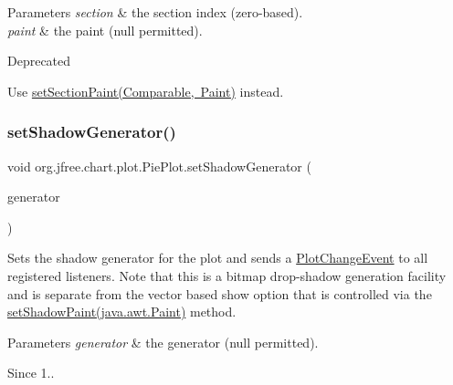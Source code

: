 \begin{DoxyParams}{Parameters}
{\em section} & the section index (zero-\/based). \\
\hline
{\em paint} & the paint ({\ttfamily null} permitted).\\
\hline
\end{DoxyParams}
\begin{DoxyRefDesc}{Deprecated}
\item[\mbox{\hyperlink{deprecated__deprecated000069}{Deprecated}}]Use \mbox{\hyperlink{classorg_1_1jfree_1_1chart_1_1plot_1_1_pie_plot_adee3362fbb406b556846f698e0ce628f}{set\+Section\+Paint(\+Comparable, Paint)}} instead. \end{DoxyRefDesc}
\mbox{\label{classorg_1_1jfree_1_1chart_1_1plot_1_1_pie_plot_a6b869408d47c89e6d9115101faecd8f4}} 
\subsubsection{\texorpdfstring{set\+Shadow\+Generator()}{setShadowGenerator()}}
{\footnotesize\ttfamily void org.\+jfree.\+chart.\+plot.\+Pie\+Plot.\+set\+Shadow\+Generator (\begin{DoxyParamCaption}\item[{\mbox{\hyperlink{interfaceorg_1_1jfree_1_1chart_1_1util_1_1_shadow_generator}{Shadow\+Generator}}}]{generator }\end{DoxyParamCaption})}

Sets the shadow generator for the plot and sends a \mbox{\hyperlink{}{Plot\+Change\+Event}} to all registered listeners. Note that this is a bitmap drop-\/shadow generation facility and is separate from the vector based show option that is controlled via the \mbox{\hyperlink{}{set\+Shadow\+Paint(java.\+awt.\+Paint)}} method.


\begin{DoxyParams}{Parameters}
{\em generator} & the generator ({\ttfamily null} permitted).\\
\hline
\end{DoxyParams}
\begin{DoxySince}{Since}
1.. 
\end{DoxySince}
\mbox{\label{classorg_1_1jfree_1_1chart_1_1plot_1_1_pie_plot_a2a77730b54c9d7f6a3395dab0eeadcb9}} 
